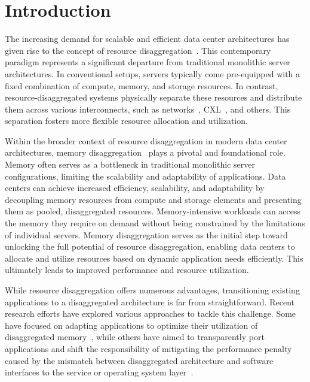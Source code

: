 \chapter{Introduction}
\label{chap:introduction}
\begin{comment}
\begin{figure}[t]
    \centering
    \texttt{[image: overview.pdf]}
      \caption{\textbf{Cloud Stack of Disaggregated Architecture.}} \vspace{-1.0em}
      \label{fig:disagg}
\end{figure}
\end{comment}
The increasing demand for scalable and efficient data center architectures has given rise to the concept of resource disaggregation~\cite{mind, legoos}. This contemporary paradigm represents a significant departure from traditional monolithic server architectures. In conventional setups, servers typically come pre-equipped with a fixed combination of compute, memory, and storage resources. In contrast, resource-disaggregated systems physically separate these resources and distribute them across various interconnects, such as networks~\cite{disagg}, CXL~\cite{cxl}, and others. This separation fosters more flexible resource allocation and utilization.

Within the broader context of resource disaggregation in modern data center architectures, memory disaggregation~\cite{memdisagg1, memdisagg2, memdisagg3, memdisagg4, memdisagg5, memdisagg6} plays a pivotal and foundational role. Memory often serves as a bottleneck in traditional monolithic server configurations, limiting the scalability and adaptability of applications. Data centers can achieve increased efficiency, scalability, and adaptability by decoupling memory resources from compute and storage elements and presenting them as pooled, disaggregated resources. Memory-intensive workloads can access the memory they require on demand without being constrained by the limitations of individual servers. Memory disaggregation serves as the initial step toward unlocking the full potential of resource disaggregation, enabling data centers to allocate and utilize resources based on dynamic application needs efficiently. This ultimately leads to improved performance and resource utilization.

While resource disaggregation offers numerous advantages, transitioning existing applications to a disaggregated architecture is far from straightforward. Recent research efforts have explored various approaches to tackle this challenge. Some have focused on adapting applications to optimize their utilization of disaggregated memory~\cite{farm, aifm}, while others have aimed to transparently port applications and shift the responsibility of mitigating the performance penalty caused by the mismatch between disaggregated architecture and software interfaces to the service or operating system layer~\cite{mind, legoos, fastswap, infiniswap}. 


